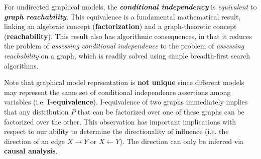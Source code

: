 \documentclass[11pt]{article}
\begin{document}
For undirected graphical models, the \emph{\textbf{conditional independency}} is \emph{equivalent} to \emph{\textbf{graph reachability}}.  This equivalence is a fundamental mathematical result, linking an algebraic concept (\textbf{factorization}) and a graph-theoretic concept (\textbf{reachability}). This result also has algorithmic consequences, in that it reduces the problem of \emph{assessing conditional independence} to the problem of \emph{assessing reachability} on a graph, which is readily solved using simple breadth-first search algorithms.

Note that graphical model reprsentation is \textbf{not unique} since different models may represent the same set of conditional independence assertions among variables (i.e. \textbf{I-equivalence}). I-equivalence of two graphs immediately implies that any distribution $P$ that can be factorized over one of these graphs can be factorized over the other. This observation has important implications with respect to our ability to determine the directionality of influence (i.e. the direction of an edge $X\rightarrow Y$ or $X\leftarrow Y$). The direction can only be inferred via \textbf{causal analysis}.
\end{document}
